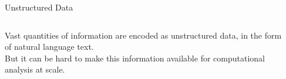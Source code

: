 \documentclass[10pt]{beamer}
\begin{document}
\begin{frame}{Unstructured Data}
  \begin{columns}
    \begin{column}{0.5\textwidth}
      Vast quantities of information are encoded as \alert{unstructured data}, in the form of natural language text.
      \\ \vspace{2em}
      But it can be hard to make this information available for computational analysis at scale.
    \end{column}
    \begin{column}{0.5\textwidth}
      \begin{center}
      \end{center}
    \end{column}
  \end{columns}
\end{frame}
\end{document}
